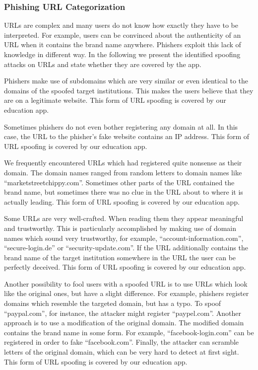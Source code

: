 \subsubsection{Phishing URL Categorization}
\label{s:url_categories}
URLs are complex and many users do not know how exactly they have to be interpreted. For example, users can be convinced about the authenticity of an URL when it contains the brand name anywhere. Phishers exploit this lack of knowledge in different way. In the following we present the identified spoofing attacks on URLs and state whether they are covered by the app.
\begin{description}[leftmargin=0cm]
	\item[Subdomain] Phishers make use of subdomains which are very similar or even identical to the domains of the spoofed target institutions. This makes the users believe that they are on a legitimate website. This form of URL spoofing is covered by our education app.
	\item[IP Address] Sometimes phishers do not even bother registering any domain at all. In this case, the URL to the phisher's fake website contains an IP address. This form of URL spoofing is covered by our education app.
	\item[Nonsense Domain] We frequently encountered URLs which had registered quite nonsense as their domain. The domain names ranged from random letters to domain names like ``marketstreetchippy.com''. Sometimes other parts of the URL contained the brand name, but sometimes there was no clue in the URL about to where it is actually leading. This form of URL spoofing is covered by our education app.
	\item[Trustworthy, But Unrelated Domain] Some URLs are very well-crafted. When reading them they appear meaningful and trustworthy. This is particularly accomplished by making use of domain names which sound very trustworthy, for example, ``account-information.com'', ``secure-login.de'' or ``security-update.com''. If the URL additionally contains the brand name of the target institution somewhere in the URL the user can be perfectly deceived. This form of URL spoofing is covered by our education app.
	\item[Similar and Deceptive Domains] Another possibility to fool users with a spoofed URL is to use URLs which look like the original ones, but have a slight difference. For example, phishers register domains which resemble the targeted domain, but has a typo. To spoof ``paypal.com'', for instance, the attacker might register ``paypel.com''. Another approach is to use a modification of the original domain. The modified domain contains the brand name in some form. For example, ``facebook-login.com'' can be registered in order to fake ``facebook.com''. Finally, the attacker can scramble letters of the original domain, which can be very hard to detect at first sight. This form of URL spoofing is covered by our education app.

\end{description}
